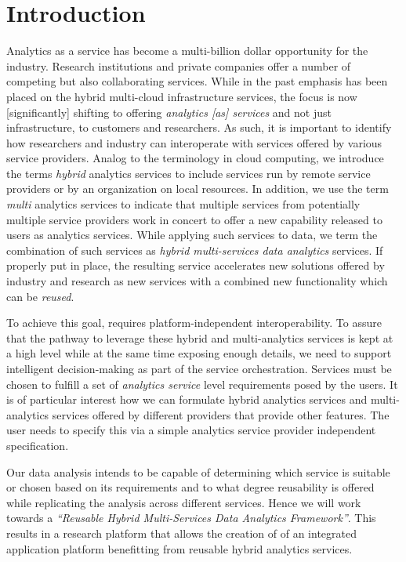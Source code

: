 
\section{Introduction}
\label{sec:summary}


Analytics as a service has become a multi-billion dollar opportunity
for the industry. Research institutions and private companies offer a number
of competing but also collaborating services. While in the past
emphasis has been placed on the hybrid multi-cloud infrastructure
services, the focus is now [significantly] shifting to offering {\em
analytics [as] services} and not just infrastructure, to customers and
researchers. As such, it is important to identify how researchers and
industry can interoperate with services offered by various service
providers. Analog to the terminology in cloud computing, we introduce
the terms {\em hybrid} analytics services to include services run by
remote service providers or by an organization on local resources. 
In
addition, we use the term {\em multi} analytics services to indicate
that multiple services from potentially multiple service providers
work in concert to offer a new capability released to users as
analytics services. While applying such services to data, we term the
combination of such services as {\em hybrid multi-services data
analytics} services. If properly put in place, the resulting service
accelerates new solutions offered by industry and research as new
services with a combined new functionality which can be {\em reused}.

To achieve this goal, requires platform-independent
interoperability.  To assure that the pathway to leverage these hybrid
and multi-analytics services is kept at a high level while at the same
time exposing enough details, we need to support intelligent
decision-making as part of the service orchestration. Services must be
chosen to fulfill a set of {\em analytics service} level requirements
posed by the users. It is of particular interest how we can formulate
hybrid analytics services and multi-analytics services offered by
different providers that provide other features. The user needs to
specify this via a simple analytics service provider independent
specification.

Our data analysis intends to be capable of determining which service is
suitable or chosen based on its requirements and to what degree
reusability is offered while replicating the analysis across different
services. Hence we will work towards a {\em ``Reusable Hybrid
Multi-Services Data Analytics Framework''}. This results in a research
platform that allows the creation of of an integrated application
platform benefitting from reusable hybrid analytics services.


